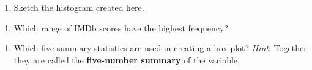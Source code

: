 \documentclass[
]{report}
\providecommand{\tightlist}{%
  \setlength{\itemsep}{0pt}\setlength{\parskip}{0pt}}
\begin{document}
\begin{enumerate}
\def\labelenumi{\arabic{enumi}.}
\setcounter{enumi}{8}
\tightlist
\item
  Sketch the histogram created here.
\end{enumerate}

\vspace{1.4in}

\begin{enumerate}
\def\labelenumi{\arabic{enumi}.}
\setcounter{enumi}{9}
\tightlist
\item
  Which range of IMDb scores have the highest frequency?
\end{enumerate}

\vspace{0.2in}

\begin{enumerate}
\def\labelenumi{\arabic{enumi}.}
\setcounter{enumi}{10}
\tightlist
\item
  Which five summary statistics are used in creating a box plot? \emph{Hint}: Together they are called the \textbf{five-number summary} of the variable.
\end{enumerate}

\vspace{0.4in}
\end{document}
